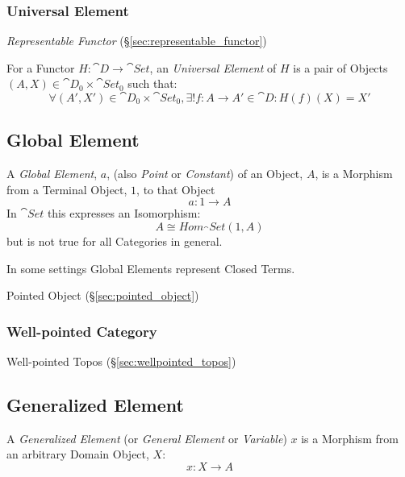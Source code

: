 \subsubsection{Universal Element}\label{sec:universal_element}

\emph{Representable Functor} (\S\ref{sec:representable_functor})

For a Functor $H : \cat{D} \rightarrow \cat{Set}$, an
\emph{Universal Element} of $H$ is a pair of Objects $(A,X) \in
\cat{D}_0 \times \cat{Set}_0$ such that:
\[
  \forall (A',X') \in \cat{D}_0 \times \cat{Set}_0,
  \exists! f : A \rightarrow A' \in \cat{D} : H(f)(X) = X'
\]



\subsection{Global Element}\label{sec:global_element}

A \emph{Global Element}, $a$, (also \emph{Point} or \emph{Constant})
of an Object, $A$, is a Morphism from a Terminal Object, $1$, to that
Object
\[
  a: 1 \rightarrow A
\]
In $\cat{Set}$ this expresses an Isomorphism:
\[
  A \cong Hom_\cat{Set}(1,A)
\]
but is not true for all Categories in general.

In some settings Global Elements represent Closed Terms.

Pointed Object (\S\ref{sec:pointed_object})



\subsubsection{Well-pointed Category}\label{sec:well_pointed}

Well-pointed Topos (\S\ref{sec:wellpointed_topos})



\subsection{Generalized Element}\label{sec:generalized_element}

A \emph{Generalized Element} (or \emph{General Element} or
\emph{Variable}) $x$ is a Morphism from an arbitrary Domain Object,
$X$:
\[
  x: X \rightarrow A
\]

